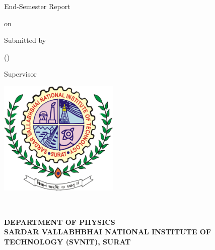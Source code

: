 \begin{center}
    {\Large End-Semester Report}
    \vspace{8pt}

    {\large {on}}
    \vspace{8pt}

    {\Large \textbf{\SubjectCode}}
    \vspace{15pt}

    \begin{spacing}{1.75}
        {\LARGE \MakeUppercase{\textbf{\ProjectTitle}}}
    \end{spacing}
    \vspace{15pt}
    


    {\large {Submitted by}} 
    \vspace{2pt}
    
    {\Large \StudentName \hspace{2pt} (\StudentAdminNo)} 
    \vspace{10pt} 

    {\large {Supervisor}}
    \vspace{2pt}
    
    {\Large \SupervisorName}
    \vspace{15pt}
    
    \includegraphics[width = 2.25in]{images/appendix/svnit_logo.png}
    \vspace{15pt}

    {\large \Semester  \\ 
    \Duration}

    \vspace{6pt}
    
    \begin{spacing}{1.25}
    {\large \textbf{DEPARTMENT OF PHYSICS \\ 
    SARDAR VALLABHBHAI NATIONAL INSTITUTE OF TECHNOLOGY (SVNIT), SURAT}} \\ 
    \end{spacing}
     

\end{center}